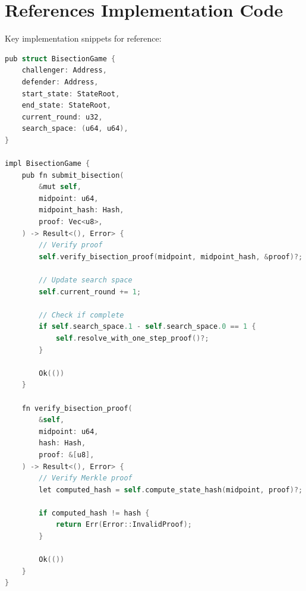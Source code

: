 \section{References Implementation Code}


Key implementation snippets for reference:

\begin{lstlisting}[language=C, caption=Bisection Game Implementation (Rust)]
pub struct BisectionGame {
    challenger: Address,
    defender: Address,
    start_state: StateRoot,
    end_state: StateRoot,
    current_round: u32,
    search_space: (u64, u64),
}

impl BisectionGame {
    pub fn submit_bisection(
        &mut self,
        midpoint: u64,
        midpoint_hash: Hash,
        proof: Vec<u8>,
    ) -> Result<(), Error> {
        // Verify proof
        self.verify_bisection_proof(midpoint, midpoint_hash, &proof)?;
        
        // Update search space
        self.current_round += 1;
        
        // Check if complete
        if self.search_space.1 - self.search_space.0 == 1 {
            self.resolve_with_one_step_proof()?;
        }
        
        Ok(())
    }
    
    fn verify_bisection_proof(
        &self,
        midpoint: u64,
        hash: Hash,
        proof: &[u8],
    ) -> Result<(), Error> {
        // Verify Merkle proof
        let computed_hash = self.compute_state_hash(midpoint, proof)?;
        
        if computed_hash != hash {
            return Err(Error::InvalidProof);
        }
        
        Ok(())
    }
}
\end{lstlisting}

